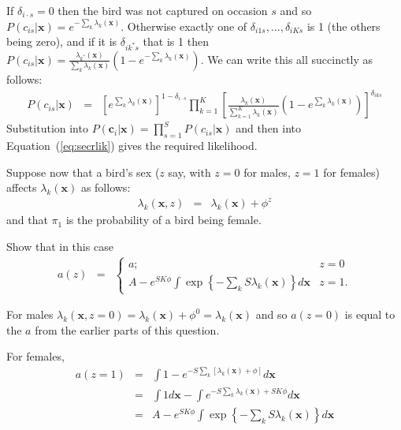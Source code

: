 \begin{questions}
\begin{parts}
{\begin{solution}
If $\delta_{i\cdot s}=0$ then the bird was not captured on occasion $s$ and so $P(c_{is}|\mathbf{x})=e^{-\sum_k\lambda_k(\mathbf{x})}$. Otherwise exactly one of $\delta_{i1s},\ldots,\delta_{iKs}$ is 1 (the others being zero), and if it is $\delta_{ik^*s}$ that is 1 then $P(c_{is}|\mathbf{x})=\frac{\lambda_{k^*}(\mathbf{x})}{\sum_k\lambda_k(\mathbf{x})}\left(1-e^{-\sum_k\lambda_k(\mathbf{x})}\right)$. We can write this all succinctly as follows:
\begin{eqnarray}
P(c_{is}|\mathbf{x})&=&\left[e^{\sum_k\lambda_k(\mathbf{x})}\right]^{1-\delta_{i\cdot s}}
\prod_{k=1}^K
\left[\frac{\lambda_k(\mathbf{x})}{\sum_{k=1}^K\lambda_k(\mathbf{x})}
\left(1-e^{\sum_k\lambda_k(\mathbf{x})}\right)\right]^{\delta_{iks}}
\end{eqnarray}
Substitution into $P(\mathbf{c}_i|\mathbf{x})=\prod_{s=1}^SP(c_{is}|\mathbf{x})$ and then into Equation~(\ref{eq:secrlik}) gives the required likelihood.

\end{solution}}

\item Suppose now that a bird's sex ($z$ say, with $z=0$ for males, $z=1$ for females) affects $\lambda_k(\mathbf{x})$ as follows:
\begin{eqnarray*}
\lambda_k(\mathbf{x},z)&=&\lambda_k(\mathbf{x})+\phi^z
\end{eqnarray*}
and that $\pi_1$ is the probability of a bird being female.

\begin{subparts}

\item Show that in this case
\begin{eqnarray*}
a(z)&=&\left\{
\begin{array}{ll} 
a; & z=0 \\ 
A-e^{SK\phi}\int\exp\left\{-\sum_k S\lambda_k(\mathbf{x})\right\}d\mathbf{x} & z=1. 
\end{array} \right.
\end{eqnarray*}

{\begin{solution}
For males $\lambda_k(\mathbf{x},z=0)=\lambda_k(\mathbf{x})+\phi^0$$=\lambda_k(\mathbf{x})$ and so $a(z=0)$ is equal to the $a$ from the earlier parts of this question.

For females,
\begin{eqnarray}
a(z=1)&=&\int 1-e^{-S\sum_k[\lambda_k(\mathbf{x})+\phi]}d\mathbf{x} \nonumber \\
&=&\int 1d\mathbf{x}-\int e^{-S\sum_k\lambda_k(\mathbf{x})+SK\phi}d\mathbf{x} \nonumber \\
&=&A-e^{SK\phi}\int\exp\left\{-\sum_k S\lambda_k(\mathbf{x})\right\}d\mathbf{x} \nonumber
\end{eqnarray}


\end{solution}}
\end{subparts}
\end{parts}
\end{questions}
